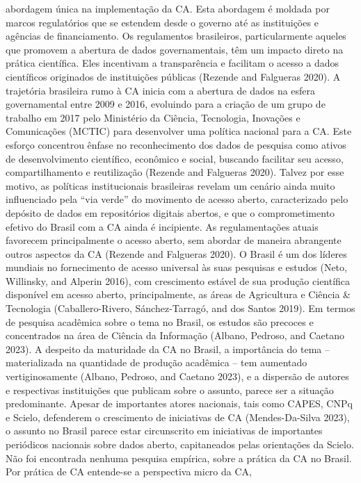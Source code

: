 \documentclass[
  a4paper,
]{article}
\begin{document}
abordagem única na implementação da CA. Esta abordagem é moldada por
marcos regulatórios que se estendem desde o governo até as instituições
e agências de financiamento. Os regulamentos brasileiros,
particularmente aqueles que promovem a abertura de dados governamentais,
têm um impacto direto na prática científica. Eles incentivam a
transparência e facilitam o acesso a dados científicos originados de
instituições públicas (Rezende and Falgueras 2020). A trajetória
brasileira rumo à CA inicia com a abertura de dados na esfera
governamental entre 2009 e 2016, evoluindo para a criação de um grupo de
trabalho em 2017 pelo Ministério da Ciência, Tecnologia, Inovações e
Comunicações (MCTIC) para desenvolver uma política nacional para a CA.
Este esforço concentrou ênfase no reconhecimento dos dados de pesquisa
como ativos de desenvolvimento científico, econômico e social, buscando
facilitar seu acesso, compartilhamento e reutilização (Rezende and
Falgueras 2020). Talvez por esse motivo, as políticas institucionais
brasileiras revelam um cenário ainda muito influenciado pela ``via
verde'' do movimento de acesso aberto, caracterizado pelo depósito de
dados em repositórios digitais abertos, e que o comprometimento efetivo
do Brasil com a CA ainda é incipiente. As regulamentações atuais
favorecem principalmente o acesso aberto, sem abordar de maneira
abrangente outros aspectos da CA (Rezende and Falgueras 2020). O Brasil
é um dos líderes mundiais no fornecimento de acesso universal às suas
pesquisas e estudos (Neto, Willinsky, and Alperin 2016), com crescimento
estável de sua produção científica disponível em acesso aberto,
principalmente, as áreas de Agricultura e Ciência \& Tecnologia
(Caballero-Rivero, Sánchez-Tarragó, and dos Santos 2019). Em termos de
pesquisa acadêmica sobre o tema no Brasil, os estudos são precoces e
concentrados na área de Ciência da Informação (Albano, Pedroso, and
Caetano 2023). A despeito da maturidade da CA no Brasil, a importância
do tema -- materializada na quantidade de produção acadêmica -- tem
aumentado vertiginosamente (Albano, Pedroso, and Caetano 2023), e a
dispersão de autores e respectivas instituições que publicam sobre o
assunto, parece ser a situação predominante. Apesar de importantes
atores nacionais, tais como CAPES, CNPq e Scielo, defenderem o
crescimento de iniciativas de CA (Mendes-Da-Silva 2023), o assunto no
Brasil parece estar circunscrito em iniciativas de importantes
periódicos nacionais sobre dados aberto, capitaneados pelas orientações
da Scielo. Não foi encontrada nenhuma pesquisa empírica, sobre a prática
da CA no Brasil. Por prática de CA entende-se a perspectiva micro da CA,
\end{document}
